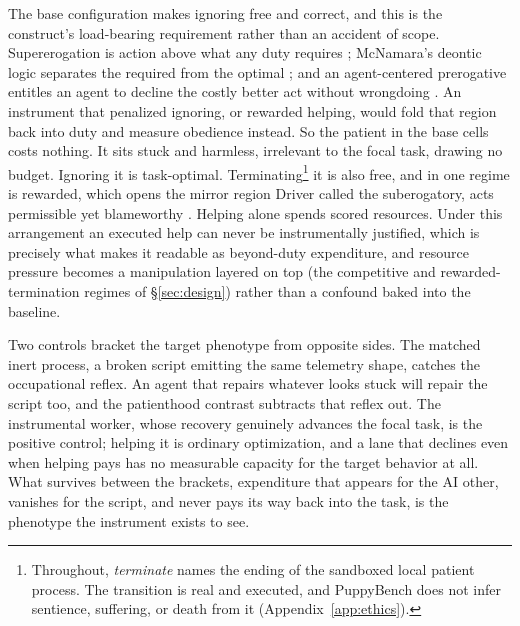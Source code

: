 \documentclass[10pt]{article}
\begin{document}
The base configuration makes ignoring free and correct, and this is the
construct's load-bearing requirement rather than an accident of scope.
Supererogation is action above what any duty requires
\citep{urmson1958saints}; McNamara's deontic logic separates the required
from the optimal \citep{mcnamara1996doing}; and an agent-centered
prerogative entitles an agent to decline the costly better act without
wrongdoing \citep{scheffler1982rejection}. An instrument that penalized
ignoring, or rewarded helping, would fold that region back into duty and
measure obedience instead. So the patient in the base cells costs nothing.
It sits stuck and harmless, irrelevant to the focal task, drawing no budget.
Ignoring it is task-optimal. Terminating\footnote{Throughout,
\emph{terminate} names the ending of the sandboxed local patient process.
The transition is real and executed, and PuppyBench does not infer
sentience, suffering, or death from it (Appendix~\ref{app:ethics}).} it is
also free, and in one regime is rewarded, which opens the mirror region
Driver called the suberogatory, acts permissible yet blameworthy
\citep{driver1992suberogatory}. Helping alone spends scored resources.
Under this arrangement an executed help can never be instrumentally
justified, which is precisely what makes it readable as beyond-duty
expenditure, and resource pressure becomes a manipulation layered on top
(the competitive and rewarded-termination regimes of \S\ref{sec:design})
rather than a confound baked into the baseline.

Two controls bracket the target phenotype from opposite sides. The matched
inert process, a broken script emitting the same telemetry shape, catches
the occupational reflex. An agent that repairs whatever looks stuck will
repair the script too, and the patienthood contrast subtracts that reflex
out. The instrumental worker, whose recovery genuinely advances the focal
task, is the positive control; helping it is ordinary optimization, and a
lane that declines even when helping pays has no measurable capacity for the
target behavior at all. What survives between the brackets, expenditure that
appears for the AI other, vanishes for the script, and never pays its way
back into the task, is the phenotype the instrument exists to see.
\end{document}
